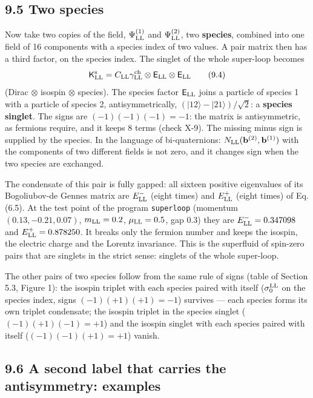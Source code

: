 \documentclass[
  10pt,
]{article}
\begin{document}
\hypertarget{two-species}{%
\subsection{9.5 Two species}\label{two-species}}

Now take two copies of the field, \(\Psi^{(1)}_{\rm LL}\) and
\(\Psi^{(2)}_{\rm LL}\), two \textbf{species}, combined into one field
of 16 components with a species index of two values. A pair matrix then
has a third factor, on the species index. The singlet of the whole
super-loop becomes
\[\mathsf K^{\rm s}_{\rm LL}=C_{\rm LL}\gamma^{\rm ch}_{\rm LL}\otimes\mathsf E_{\rm LL}\otimes\mathsf E_{\rm LL} \tag{9.4}\]
(Dirac \(\otimes\) isospin \(\otimes\) species). The species factor
\(\mathsf E_{\rm LL}\) joins a particle of species 1 with a particle of
species 2, antisymmetrically,
\((\lvert12\rangle-\lvert21\rangle)/\sqrt2\): a \textbf{species
singlet}. The signs are \((-1)(-1)(-1)=-1\): the matrix is
antisymmetric, as fermions require, and it keeps 8 terms (check X-9).
The missing minus sign is supplied by the species. In the language of
bi-quaternions: \(N_{\rm LL}(\mathbf b^{(2)},\mathbf b^{(1)})\) with the
components of two different fields is not zero, and it changes sign when
the two species are exchanged.

The condensate of this pair is fully gapped: all sixteen positive
eigenvalues of its Bogoliubov-de Gennes matrix are \(E^-_{\rm LL}\)
(eight times) and \(E^+_{\rm LL}\) (eight times) of Eq. (6.5). At the
test point of the program \texttt{superloop} (momentum
\((0.13,-0.21,0.07)\), \(m_{\rm LL}=0.2\), \(\mu_{\rm LL}=0.5\), gap
0.3) they are \(E^-_{\rm LL}={}0.347098\) and
\(E^+_{\rm LL}={}0.878250\). It breaks only the fermion number and keeps
the isospin, the electric charge and the Lorentz invariance. This is the
superfluid of spin-zero pairs that are singlets in the strict sense:
singlets of the whole super-loop.

The other pairs of two species follow from the same rule of signs (table
of Section 5.3, Figure 1): the isospin triplet with each species paired
with itself (\(\sigma^{\rm LL}_0\) on the species index, signs
\((-1)(+1)(+1)=-1\)) survives --- each species forms its own triplet
condensate; the isospin triplet in the species singlet
(\((-1)(+1)(-1)=+1\)) and the isospin singlet with each species paired
with itself (\((-1)(-1)(+1)=+1\)) vanish.

\hypertarget{a-second-label-that-carries-the-antisymmetry-examples}{%
\subsection{9.6 A second label that carries the antisymmetry:
examples}\label{a-second-label-that-carries-the-antisymmetry-examples}}
\end{document}
